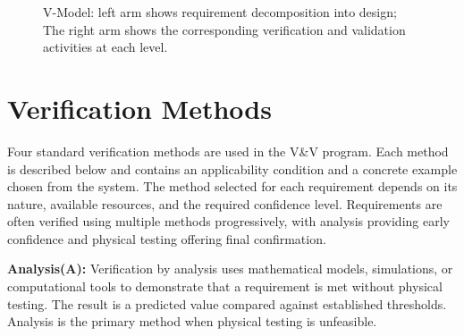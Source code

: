 \begin{figure}[H]
\caption{V-Model: left arm shows requirement decomposition into design; The 
right arm shows the corresponding verification and validation activities at each level.}
\label{fig:vmodel}
\end{figure}



\section{Verification Methods}
\label{sec:vermet}

Four standard verification methods are used in the V\&V program. Each method is described below and contains an applicability condition and a concrete example chosen from the system. The method selected for each requirement depends on its nature, available resources, and the required confidence level. Requirements are often verified using multiple methods progressively, with analysis providing early confidence and physical testing offering final confirmation.


\textbf{Analysis(A): }Verification by analysis uses mathematical models, simulations, or computational tools to demonstrate that a requirement is met without physical testing. The result is a predicted value compared against established thresholds. Analysis is the primary method when physical testing is unfeasible.

